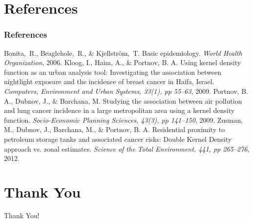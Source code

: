 \documentclass{beamer}
\theoremstyle{definition}
\begin{document}
\section*{References}

\begin{frame}\frametitle{References}
    \footnotesize
    \begin{thebibliography}{10}
            Bonita,~R., Beaglehole,~R., \& Kjellstr{\" o}m,~T.
            Basic epidemiology.
            {\em World Health Organization}, 2006.
            Kloog, I., Haim, A., \& Portnov, B. A.
            Using kernel density function as an urban analysis tool: Investigating the association between nightlight exposure and the incidence of breast cancer in Haifa, Israel.
            {\em Computers, Environment and Urban Systems, 33(1), pp 55--63}, 2009.
            Portnov, B. A., Dubnov, J., \& Barchana, M.
            Studying the association between air pollution and lung cancer incidence in a large metropolitan area using a kernel density function.
            {\em Socio-Economic Planning Sciences, 43(3), pp 141--150}, 2009.
            Zusman, M., Dubnov, J., Barchana, M., \& Portnov, B. A.
            Residential proximity to petroleum storage tanks and associated cancer risks: Double Kernel Density approach vs. zonal estimates.
            {\em Science of the Total Environment, 441, pp 265--276}, 2012.
    \end{thebibliography}
\end{frame}

\section{Thank You}

\begin{frame}
    \begin{center}
        {
            \color{orange}
            \fontsize{40}{50}\selectfont Thank You!
        }
    \end{center}
\end{frame}
\end{document}
